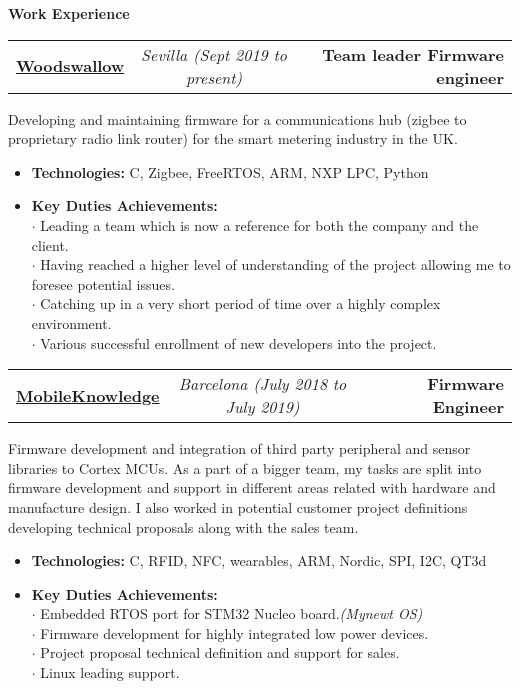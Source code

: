 \documentclass[9pt]{extarticle}
\begin{document}
\textbf{Work Experience}\\\linea
\vspace{1cm}
\begin{table}[H]
\begin{tabularx}{\textwidth}{lcXr}
\textbf{\href{http://www.woodswallow.tech/}{Woodswallow}} & \emph{Sevilla (Sept 2019 to present)} & & \textbf{Team leader Firmware engineer}
\end{tabularx}
\end{table}
\par
\hspace{20pt} Developing and maintaining firmware for a communications hub (zigbee to proprietary radio link router) for the smart metering industry in the UK.
\begin{itemize}
    \item{\textbf{Technologies:} C, Zigbee, FreeRTOS, ARM, NXP LPC, Python}
    \item{\textbf{Key Duties Achievements:}}
\\$\cdot$ Leading a team which is now a reference for both the company and the client.
\\$\cdot$ Having reached a higher level of understanding of the project allowing me to foresee potential issues.
\\$\cdot$ Catching up in a very short period of time over a highly complex environment.
\\$\cdot$ Various successful enrollment of new developers into the project. 
\end{itemize}

\begin{table}[H]
\begin{tabularx}{\textwidth}{lcXr}
\textbf{\href{http://www.themobileknoledge.com/}{MobileKnowledge}} & \emph{Barcelona (July 2018 to July 2019)} & & \textbf{Firmware Engineer}
\end{tabularx}
\end{table}
\par
\hspace{20pt} Firmware development and integration of third party peripheral and sensor libraries to 
Cortex MCUs. As a part of a bigger team, my tasks are split into firmware development and support in 
different areas related with hardware and manufacture design. I also worked in potential customer project
definitions developing technical proposals along with the sales team.
\begin{itemize}
    \item{\textbf{Technologies:} C, RFID, NFC, wearables, ARM, Nordic, SPI, I2C, QT3d}
    \item{\textbf{Key Duties Achievements:}}
\\$\cdot$ Embedded RTOS port for STM32 Nucleo board.\emph{(Mynewt OS)}
\\$\cdot$ Firmware development for highly integrated low power devices.
\\$\cdot$ Project proposal technical definition and support for sales.
\\$\cdot$ Linux leading support.
\end{itemize}
\end{document}
